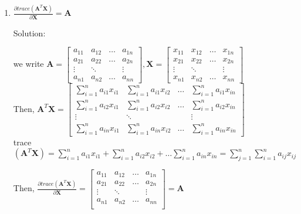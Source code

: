 \documentclass[12pt]{article}
\newcommand{\solu}{{\color{blue} Solution:}}
\begin{document}
\begin{enumerate}
\begin{enumerate}
            \item $\frac{\partial trace(\pmb{A}^T\pmb{X})}{\partial \pmb{X}} = \pmb{A}$ 
            
            \solu 

            we write $\pmb{A} = \begin{bmatrix}
                a_{11} & a_{12} & \dots & a_{1n} \\
                a_{21} & a_{22} & \dots & a_{2n} \\
                \vdots & \ddots &  & \vdots \\
                a_{n1} & a_{n2} & \dots & a_{nn}
            \end{bmatrix}, \pmb{X} = 
            \begin{bmatrix}
                x_{11} & x_{12} & \dots & x_{1n} \\
                x_{21} & x_{22} & \dots & x_{2n} \\
                \vdots & \ddots &  & \vdots \\
                x_{n1} & x_{n2} & \dots & x_{nn}
            \end{bmatrix}$\\
            Then, $\pmb{A}^T\pmb{X} = 
            \begin{bmatrix}
                \sum_{i = 1}^n a_{i1}x_{i1} & \sum_{i = 1}^n a_{i1}x_{i2} & \dots & \sum_{i = 1}^n a_{i1}x_{in}\\
                \sum_{i = 1}^n a_{i2}x_{i1} & \sum_{i = 1}^n a_{i2}x_{i2} & \dots & \sum_{i = 1}^n a_{i2}x_{in} \\
                \vdots & \ddots &  & \vdots \\
                \sum_{i = 1}^n a_{in}x_{i1} & \sum_{i = 1}^n a_{in}x_{i2}& \dots  &  \sum_{i = 1}^n a_{in}x_{in}
            \end{bmatrix}$\\
            trace$(\pmb{A}^T\pmb{X}) = \sum_{i = 1}^n a_{i1}x_{i1} + \sum_{i = 1}^n a_{i2}x_{i2}  + \dots \sum_{i = 1}^n a_{in}x_{in} = \sum_{j = 1}^{n}\sum_{i = 1}^{n} a_{ij}x_{ij}$

            Then, $\frac{\partial trace(\pmb{A}^T\pmb{X})}{\partial \pmb{X}} =
            \begin{bmatrix}
                a_{11} & a_{12} & \dots & a_{1n} \\
                a_{21} & a_{22} & \dots & a_{2n} \\
                \vdots & \ddots &  & \vdots \\
                a_{n1} & a_{n2} & \dots & a_{nn} \\
            \end{bmatrix} = \pmb{A}
            $ 


\end{enumerate}
\end{enumerate}
\end{document}
